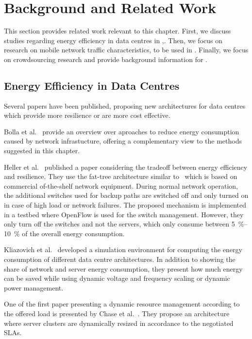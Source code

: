 \section{Background and Related Work}\label{sec:cloud:related_work}
This section provides related work relevant to this chapter.
First, we discuss studies regarding energy efficiency in data centres in ,.
Then, we focus on research on mobile network traffic characteristics, to be used in .
Finally, we focus on crowdsourcing research and provide background information for .

\subsection{Energy Efficiency in Data Centres}
Several papers have been published, proposing new architectures for data centres which provide more resilience or are more cost effective\cite{Al-Fares2008, Greenberg2009a, Guo2009}.

Bolla et al.~\cite{Bolla2011} provide an overview over aproaches to reduce energy consumption caused by network infrastucture, offering a complementary view to the methods suggested in this chapter.  

Heller et al.~\cite{Heller2010} published a paper considering the tradeoff between energy efficiency and resilience.
They use the fat-tree architecture similar to~\cite{Al-Fares2008, Greenberg2009a} which is based on commercial of-the-shelf network equipment.
During normal network operation, the additional switches used for backup paths are switched off and only turned on in case of high load or network failures.
The proposed mechanism is implemented in a testbed where OpenFlow is used for the switch management.
However, they only turn off the switches and not the servers, which only consume between \SIrange{5}{10}{\percent} of the overall energy consumption.

Kliazovich et al.~\cite{Kliazovich2010} developed a simulation environment for computing the energy consumption of different data centre architectures. In addition to showing the share of network and server energy consumption, they present how much energy can be saved while using dynamic voltage and frequency scaling or dynamic power management.

One of the first paper presenting a dynamic resource management according to the offered load  is presented by Chase et al.~\cite{Chase2001}. They propose an architecture where server clusters are dynamically resized in accordance to the negotiated SLAs.

